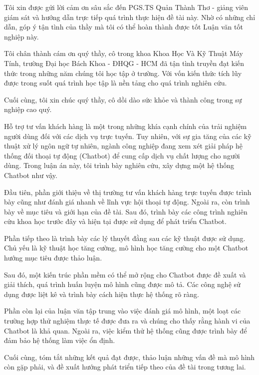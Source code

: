 \frontmatter

\begin{acknowledgments}

Tôi xin được gửi lời cảm ơn sâu sắc đến PGS.TS Quản Thành Thơ -
giảng viên giám sát và hướng dẫn trực tiếp quá trình thực hiện
đề tài này. Nhờ có những chỉ dẫn, góp ý tận tình của thầy mà
tôi có thể hoàn thành được tốt Luận văn tốt nghiệp này.

Tôi chân thành cám ơn quý thầy, cô trong khoa Khoa Học Và Kỹ Thuật
Máy Tính, trường Đại học Bách Khoa - ĐHQG - HCM đã tận tình
truyền đạt kiến thức trong những năm chúng tôi học tập ở trường.
Với vốn kiến thức tích lũy được trong suốt quá trình học tập là
nền tảng cho quá trình nghiên cứu.

Cuối cùng, tôi xin chúc quý thầy, cô dồi dào sức khỏe và thành công
trong sự nghiệp cao quý.

\end{acknowledgments}

\begin{abstractTV}

Hỗ trợ tư vấn khách hàng là một trong những khía cạnh chính của
trải nghiệm người dùng đối với các dịch vụ trực tuyến. Tuy nhiên,
với sự gia tăng của các kỹ thuật xử lý ngôn ngữ tự nhiên, ngành
công nghiệp đang xem xét giải pháp hệ thống đối thoại tự động
(Chatbot) để cung cấp dịch vụ chất lượng cho người dùng. Trong
luận án này, tôi trình bày nghiên cứu, xây dựng một hệ thống
Chatbot như vậy.

Đầu tiên, phần giới thiệu về thị trường tư vấn khách hàng trực tuyến
được trình bày cũng như đánh giá nhanh về lĩnh vực hội thoại tự động.
Ngoài ra, còn trình bày về mục tiêu và giới hạn của đề tài. Sau đó,
trình bày các công trình nghiên cứu khoa học trước đây và hiện tại
được sử dụng để phát triển Chatbot.

Phần tiếp theo là trình bày các lý thuyết đằng sau các kỹ thuật được
sử dụng. Chủ yếu là kỹ thuật học tăng cường, mô hình học tăng cường
cho một Chatbot hướng mục tiêu được thảo luận.

Sau đó, một kiến trúc phần mềm có thể mở rộng cho Chatbot được đề xuất
và giải thích, quá trình huấn luyện mô hình cũng được mô tả.
Các công nghệ sử dụng được liệt kê và trình bày cách
hiện thực hệ thống rõ ràng.

Phần còn lại của luận văn tập trung vào việc đánh giá mô hình, một loạt
các trường hợp thử nghiệm thực tế được đưa ra và chúng cho thấy rằng
hành vi của Chatbot là khả quan. Ngoài ra, việc kiểm thử hệ thống
cũng được trình bày để đảm bảo hệ thống làm việc ổn định.

Cuối cùng, tóm tắt những kết quả đạt được, thảo luận những vấn đề mà
mô hình còn gặp phải, và đề xuất hướng phát triển tiếp theo của
đề tài trong tương lai.

\end{abstractTV}

